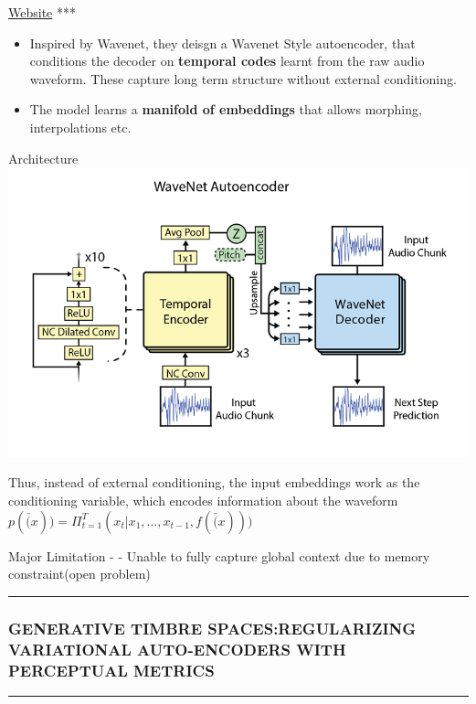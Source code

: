 \documentclass[11pt]{article}
\makeatletter
\def\maxwidth{\ifdim\Gin@nat@width>\linewidth\linewidth
    \else\Gin@nat@width\fi}
\let\Oldincludegraphics\includegraphics
\renewcommand{\includegraphics}[1]{\Oldincludegraphics[width=.8\maxwidth]{#1}}
\providecommand{\tightlist}{%
      \setlength{\itemsep}{0pt}\setlength{\parskip}{0pt}}
\makeatother
\begin{document}
\href{https://magenta.tensorflow.org/nsynth}{Website} ***

    \begin{itemize}
\tightlist
\item
  Inspired by Wavenet, they deisgn a Wavenet Style autoencoder, that
  conditions the decoder on \textbf{temporal codes} learnt from the raw
  audio waveform. These capture long term structure without external
  conditioning.
\item
  The model learns a \textbf{manifold of embeddings} that allows
  morphing, interpolations etc.
\end{itemize}

    Architecture \includegraphics{fig_05.PNG}

Thus, instead of external conditioning, the input embeddings work as the
conditioning variable, which encodes information about the waveform
\(p(\bar(x)) = \Pi_{t=1}^{T}(x_{t}|x_{1},\dots,x_{t-1},f(\bar(x)))\)

Major Limitation - - Unable to fully capture global context due to
memory constraint(open problem)

    \begin{center}\rule{0.5\linewidth}{\linethickness}\end{center}

\subsubsection{GENERATIVE TIMBRE SPACES:REGULARIZING VARIATIONAL
AUTO-ENCODERS WITH PERCEPTUAL
METRICS}\label{generative-timbre-spacesregularizing-variational-auto-encoders-with-perceptual-metrics}

\begin{center}\rule{0.5\linewidth}{\linethickness}\end{center}
\end{document}
